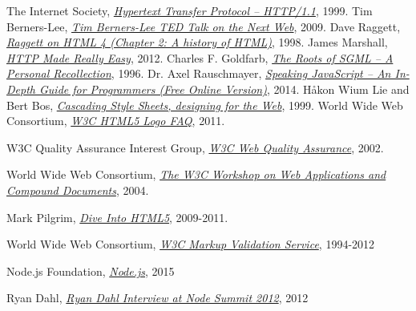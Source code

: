 \renewcommand{\bibname}{References}
\begin{thebibliography}{99}

  The Internet Society,
  \emph{\href{http://tools.ietf.org/html/rfc2616}{Hypertext Transfer Protocol -- HTTP/1.1}},  
  1999.
  Tim Berners-Lee,
  \emph{\href{http://www.ted.com/talks/tim_berners_lee_on_the_next_web?language=en}{Tim Berners-Lee TED Talk on the Next Web}},  
  2009.
  Dave Raggett,
  \emph{\href{http://www.w3.org/People/Raggett/book4/ch02.html}{Raggett on HTML 4 (Chapter 2: A history of HTML)}},  
  1998.
  James Marshall,
  \emph{\href{http://www.jmarshall.com/easy/http/}{HTTP Made Really Easy}},  
  2012.
Charles F. Goldfarb,
\emph{\href{http://www.sgmlsource.com/history/roots.htm}{The Roots of SGML -- A Personal Recollection}},  
1996.
Dr. Axel Rauschmayer,
\emph{\href{http://speakingjs.com/es5/}{Speaking JavaScript -- An In-Depth Guide for Programmers (Free Online Version)}},  
2014.
Håkon Wium Lie and Bert Bos,
\emph{\href{http://www.w3.org/Style/LieBos2e/history/Overview.html}{Cascading Style Sheets, designing for the Web}},  
1999.
World Wide Web Consortium,
\emph{\href{http://www.w3.org/html/logo/faq.html}{W3C HTML5 Logo FAQ}},  
2011.

W3C Quality Assurance Interest Group,
\emph{\href{http://www.w3.org/QA/2002/04/Web-Quality}{W3C Web Quality Assurance}},  
2002.

World Wide Web Consortium,
\emph{\href{http://www.w3.org/2004/04/webapps-cdf-ws/}{The W3C Workshop on Web Applications and Compound Documents}},  
2004.

Mark Pilgrim,
\emph{\href{http://diveintohtml5.info/index.html}{Dive Into HTML5}},  
2009-2011.

World Wide Web Consortium,
\emph{\href{https://validator.w3.org/}{W3C Markup Validation Service}},  
1994-2012

Node.js Foundation,
\emph{\href{https://nodejs.org/}{Node.js}},  
2015

Ryan Dahl,
\emph{\href{https://youtu.be/Fc26auhSLqM?t=1m32s}{Ryan Dahl Interview at Node Summit 2012}},  
2012


\end{thebibliography}
